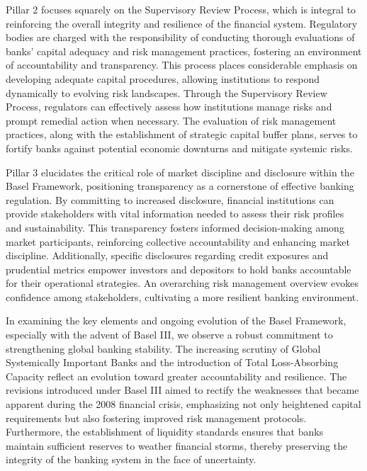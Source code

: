 Pillar 2 focuses squarely on the Supervisory Review Process, which is integral to reinforcing the overall integrity and resilience of the financial system. Regulatory bodies are charged with the responsibility of conducting thorough evaluations of banks' capital adequacy and risk management practices, fostering an environment of accountability and transparency. This process places considerable emphasis on developing adequate capital procedures, allowing institutions to respond dynamically to evolving risk landscapes. Through the Supervisory Review Process, regulators can effectively assess how institutions manage risks and prompt remedial action when necessary. The evaluation of risk management practices, along with the establishment of strategic capital buffer plans, serves to fortify banks against potential economic downturns and mitigate systemic risks.

Pillar 3 elucidates the critical role of market discipline and disclosure within the Basel Framework, positioning transparency as a cornerstone of effective banking regulation. By committing to increased disclosure, financial institutions can provide stakeholders with vital information needed to assess their risk profiles and sustainability. This transparency fosters informed decision-making among market participants, reinforcing collective accountability and enhancing market discipline. Additionally, specific disclosures regarding credit exposures and prudential metrics empower investors and depositors to hold banks accountable for their operational strategies. An overarching risk management overview evokes confidence among stakeholders, cultivating a more resilient banking environment.

In examining the key elements and ongoing evolution of the Basel Framework, especially with the advent of Basel III, we observe a robust commitment to strengthening global banking stability. The increasing scrutiny of Global Systemically Important Banks and the introduction of Total Loss-Absorbing Capacity reflect an evolution toward greater accountability and resilience. The revisions introduced under Basel III aimed to rectify the weaknesses that became apparent during the 2008 financial crisis, emphasizing not only heightened capital requirements but also fostering improved risk management protocols. Furthermore, the establishment of liquidity standards ensures that banks maintain sufficient reserves to weather financial storms, thereby preserving the integrity of the banking system in the face of uncertainty.

